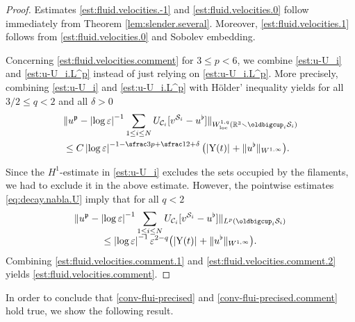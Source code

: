 \documentclass[JEP,XML,SOM,Unicode, NoEqCountersInSection,NoFloatCountersInSection,published]{cedram}
\newcommand{\R}{\mathbb{R}}
\let\eps\varepsilon
\newcommand{\loc}{\mathrm{loc}}
\newcommand{\rY}{\mathrm{Y}}
\theoremstyle{definition}
\theoremstyle{remark}
\begin{document}
\begin{proof}
Estimates \eqref{est:fluid.velocities.-1} and \eqref{est:fluid.velocities.0} follow immediately from Theorem \ref{lem:slender.several}. Moreover, \eqref{est:fluid.velocities.1} follows from \eqref{est:fluid.velocities.0} and Sobolev embedding.

Concerning \eqref{est:fluid.velocities.comment} for $3 \leq p < 6$,
we combine \eqref{est:u-U_i} and \eqref{est:u-U_i.L^p} instead of just relying on \eqref{est:u-U_i.L^p}.
More precisely, combining \eqref{est:u-U_i} and \eqref{est:u-U_i.L^p} with Hölder' inequality yields for all $3/2 \leq q < 2$ and all $\delta > 0$
\begin{align} \label{est:fluid.velocities.comment.1}
&\|u^\mathfrak{p} - \left|\log \eps\right|^{-1} \sum_{1 \leq i \leq N} U_{\mathcal C_i}[v^{{\mathcal S}_i} - u^\flat]\|_{W^{1,q}_{\loc}(\R^3 \smallsetminus \oldbigcup_i \mathcal S_i)}\\
&\leq C \left|\log \eps\right|^{-1 - \sfrac 3 p + \sfrac 1 2 + \delta} \big(|\rY(t)|_{} + \|u^\flat\|_{W^{1,\infty}} \big).
\end{align}

Since the $H^1$-estimate in \eqref{est:u-U_i} excludes the sets occupied by the filaments, we had to exclude it in the above estimate. However, the pointwise estimates \eqref{eq:decay.nabla.U}
imply that for all $q < 2$\vspace*{-3pt}
\begin{multline} \label{est:fluid.velocities.comment.2}
\|u^\mathfrak{p} - \left|\log \eps\right|^{-1} \sum_{1 \leq i \leq N} U_{\mathcal C_i}[v^{{\mathcal S}_i} - u^\flat]\|_{L^p(\oldbigcup_i \mathcal S_i)}\\[-5pt]
\leq \left|\log \eps\right|^{-1} \eps^{2-q} \big(|\rY(t)|_{} + \|u^\flat\|_{W^{1,\infty}} \big).
\end{multline}
Combining \eqref{est:fluid.velocities.comment.1} and \eqref{est:fluid.velocities.comment.2} yields \eqref{est:fluid.velocities.comment}.
\end{proof}
In order to conclude that \eqref{conv-flui-precised} and \eqref{conv-flui-precised.comment} hold true, we show the following result.
\end{document}
